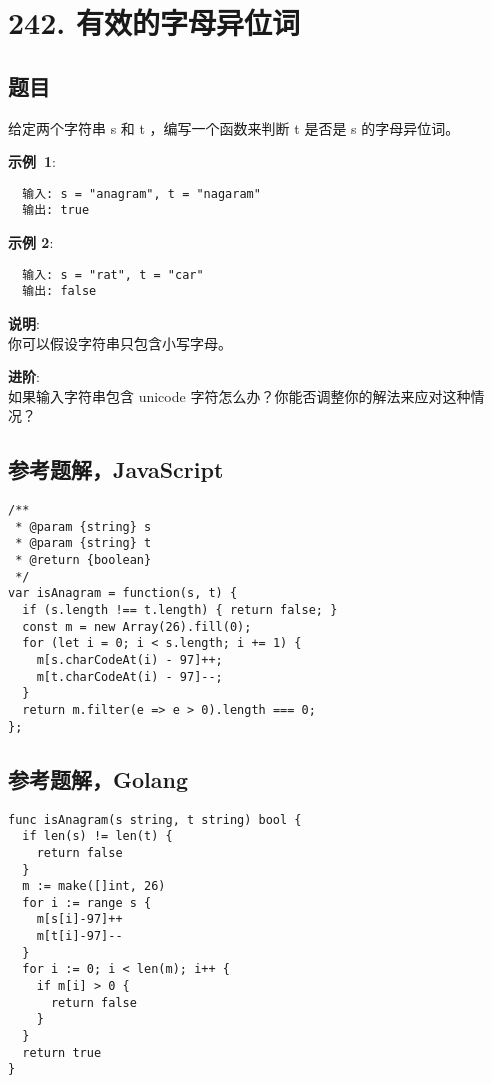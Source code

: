 \newpage
\section{242. 有效的字母异位词}
\label{leetcode:242}

\subsection{题目}

给定两个字符串 s 和 t ，编写一个函数来判断 t 是否是 s 的字母异位词。

\textbf{示例 1}:

\begin{verbatim}
  输入: s = "anagram", t = "nagaram"
  输出: true
\end{verbatim}

\textbf{示例 2}:

\begin{verbatim}
  输入: s = "rat", t = "car"
  输出: false
\end{verbatim}

\textbf{说明}:\\
你可以假设字符串只包含小写字母。

\textbf{进阶}:\\
如果输入字符串包含 unicode 字符怎么办？你能否调整你的解法来应对这种情况？

\subsection{参考题解，JavaScript}

\begin{verbatim}
/**
 * @param {string} s
 * @param {string} t
 * @return {boolean}
 */
var isAnagram = function(s, t) {
  if (s.length !== t.length) { return false; }
  const m = new Array(26).fill(0);
  for (let i = 0; i < s.length; i += 1) {
    m[s.charCodeAt(i) - 97]++;
    m[t.charCodeAt(i) - 97]--;
  }
  return m.filter(e => e > 0).length === 0;
};
\end{verbatim}

\subsection{参考题解，Golang}

\begin{verbatim}
func isAnagram(s string, t string) bool {
  if len(s) != len(t) {
    return false
  }
  m := make([]int, 26)
  for i := range s {
    m[s[i]-97]++
    m[t[i]-97]--
  }
  for i := 0; i < len(m); i++ {
    if m[i] > 0 {
      return false
    }
  }
  return true
}
\end{verbatim}
